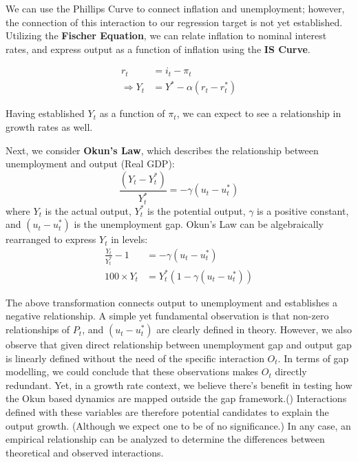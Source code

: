 \vspace{\baselineskip}

We can use the Phillips Curve to connect inflation and unemployment; however, the connection of this interaction to our regression target is not yet established.
Utilizing the \textbf{Fischer Equation}, we can relate inflation to nominal interest rates, and express output as a function of inflation using the \textbf{IS Curve}.

\begin{equation}
    \begin{aligned}
        r_t &= i_t - \pi_t \\
        \Rightarrow Y_t &= Y^* - \alpha(r_t - r_t^*)
    \end{aligned}
    \label{eq:fischer_output}
\end{equation}

\noindent Having established $Y_t$ as a function of $\pi_t$, we can expect to see a relationship in growth rates as well.

\vspace{\baselineskip}

Next, we consider \textbf{Okun's Law}, which describes the relationship between unemployment and output (Real GDP):
\begin{equation}
    \frac{(Y_t-Y_t^*)}{Y_t^*} = -\gamma(u_t - u_t^*)
    \label{eq:okuns_law}
\end{equation}
where $Y_t$ is the actual output, $Y_t^*$ is the potential output, $\gamma$ is a positive constant, and $(u_t - u_t^*)$ is the unemployment gap.
Okun's Law can be algebraically rearranged to express $Y_t$ in levels:
\begin{equation}
    \begin{aligned}
        \frac{Y_t}{Y_t^*} - 1 &= -\gamma(u_t - u_t^*) \\
        100\times Y_t &= Y_t^*(1 - \gamma(u_t - u_t^*))
    \end{aligned}
    \label{eq:okuns_levels}
\end{equation}

\vspace{\baselineskip}

\noindent The above transformation connects output to unemployment and establishes a negative relationship.
A simple yet fundamental observation is that non-zero relationships of $P_t$, and $(u_t - u_t^*)$ are clearly defined in theory.
However, we also observe that given direct relationship between unemployment gap and output gap is linearly defined without the need of the specific interaction $O_t$.
In terms of gap modelling, we could conclude that these observations makes $O_t$ directly redundant.
Yet, in a growth rate context, we believe there's benefit in testing how the Okun based dynamics are mapped outside the gap framework.(\cite{ferrentino_mathematical_2020})
Interactions defined with these variables are therefore potential candidates to explain the output growth. (Although we expect one to be of no significance.)
In any case, an empirical relationship can be analyzed to determine the differences between theoretical and observed interactions.

